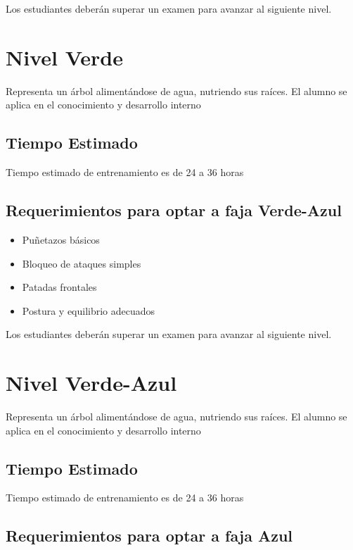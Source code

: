 Los estudiantes deberán superar un examen para avanzar al siguiente nivel.


\section{Nivel Verde}

Representa un árbol alimentándose de agua, nutriendo sus raíces. El alumno se aplica en el conocimiento y desarrollo interno

\subsection[Duración]{Tiempo Estimado}

Tiempo estimado de entrenamiento es de 24 a 36 horas

\subsection{Requerimientos para optar a faja Verde-Azul}

\begin{itemize}
	\item Puñetazos básicos
	\item Bloqueo de ataques simples
	\item Patadas frontales
	\item Postura y equilibrio adecuados
\end{itemize}

Los estudiantes deberán superar un examen para avanzar al siguiente nivel.

\section{Nivel Verde-Azul}

Representa un árbol alimentándose de agua, nutriendo sus raíces. El alumno se aplica en el conocimiento y desarrollo interno

\subsection[Duración]{Tiempo Estimado}

Tiempo estimado de entrenamiento es de 24 a 36 horas

\subsection{Requerimientos para optar a faja Azul}

